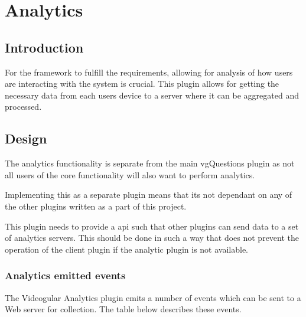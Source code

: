 
\chapter{Analytics} \label{Chapter: Analytics}


\begin{preamble}
\end{preamble}

\section{Introduction}

For the framework to fulfill the requirements, allowing for analysis of how users are interacting with the system is crucial. This plugin allows for getting the necessary data from each users device to a server where it can be aggregated and processed.

\section{Design}

The analytics functionality is separate from the main vgQuestions plugin as not all users of the core functionality will also want to perform analytics.

Implementing this as a separate plugin means that its not dependant on any of the other plugins written as a part of this project.

This plugin needs to provide a api such that other plugins can send data to a set of analytics servers. This should be done in such a way that does not prevent the operation of the client plugin if the analytic plugin is not available.

\subsection{Analytics emitted events}

The Videogular Analytics plugin emits a number of events which can be sent to a Web server for collection. The table below describes these events.

